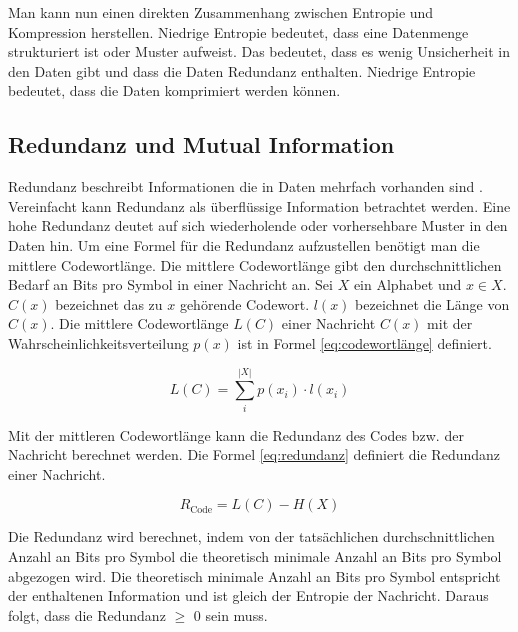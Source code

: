 \documentclass[conference]{IEEEtran}
\begin{document}
Man kann nun einen direkten Zusammenhang zwischen Entropie und Kompression herstellen. 
Niedrige Entropie bedeutet, dass eine Datenmenge strukturiert ist oder Muster aufweist. 
Das bedeutet, dass es wenig Unsicherheit in den Daten gibt und dass die Daten Redundanz 
enthalten. Niedrige Entropie bedeutet, dass die Daten komprimiert werden können.


\subsection{Redundanz und Mutual Information}

Redundanz beschreibt Informationen die in Daten mehrfach vorhanden sind \cite{friedrichs}. 
Vereinfacht kann Redundanz als überflüssige Information betrachtet werden.
Eine hohe Redundanz deutet auf sich wiederholende oder vorhersehbare Muster in den Daten hin.
Um eine Formel für die Redundanz aufzustellen benötigt man die mittlere Codewortlänge.
Die mittlere Codewortlänge gibt den durchschnittlichen Bedarf an Bits pro Symbol in einer
Nachricht an.
Sei $X$ ein Alphabet und $x \in X$.
$C(x)$ bezeichnet das zu $x$ gehörende Codewort.
$l(x)$ bezeichnet die Länge von $C(x)$.
Die mittlere Codewortlänge $L(C)$ einer Nachricht $C(x)$ mit der Wahrscheinlichkeitsverteilung
$p(x)$ ist in Formel \ref{eq:codewortlänge} definiert.

\begin{equation}
  \label{eq:codewortlänge}
  L(C) = \sum_{i}^{|X|} p(x_i) \cdot l(x_i)
\end{equation}

Mit der mittleren Codewortlänge kann die Redundanz des Codes bzw. der Nachricht berechnet 
werden.
Die Formel \ref{eq:redundanz} definiert die Redundanz einer Nachricht.

\begin{equation}
  \label{eq:redundanz}
  R_{\text{Code}} = L(C) - H(X)
\end{equation}

Die Redundanz wird berechnet, indem von der tatsächlichen durchschnittlichen
Anzahl an Bits pro Symbol die theoretisch minimale Anzahl an Bits pro Symbol
abgezogen wird.
Die theoretisch minimale Anzahl an Bits pro Symbol entspricht der enthaltenen
Information und ist gleich der Entropie der Nachricht.
Daraus folgt, dass die Redundanz $\geq$ 0 sein muss.
\end{document}
